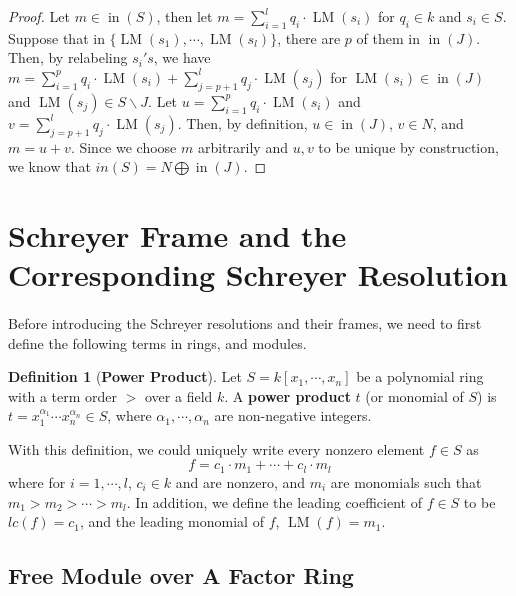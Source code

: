 \documentclass{article}
\newcommand{\lm}{\ensuremath{\operatorname{LM}}}
\newcommand{\initTerm}{\ensuremath{\operatorname{in}}}
\theoremstyle{definition}
\newtheorem{definition}{Definition}[section]
\theoremstyle{remark}
\theoremstyle{example}
\begin{document}
\begin{proof}
    Let $m \in \initTerm(S)$, then let $m = \sum_{i = 1}^{l}{q_i\cdot \lm(s_i)}$ for $q_i \in k$ and $s_i \in S$. Suppose that in $\{\lm(s_1),\cdots,\lm(s_l)\}$, there are $p$ of them in $\initTerm(J)$. Then, by relabeling $s_i's$, we have $m = \sum_{i = 1}^{p}{q_i \cdot \lm(s_i)} + \sum_{j = p+1}^{l}{q_j\cdot \lm(s_j)}$ for $\lm(s_i) \in \initTerm(J)$ and $\lm(s_j) \in S\backslash J$. Let $u = \sum_{i = 1}^{p}{q_i \cdot \lm(s_i)}$ and $v = \sum_{j = p+1}^{l}{q_j\cdot \lm(s_j)}$. Then, by definition, $u \in \initTerm(J)$, $v \in N$, and $m = u + v$. Since we choose $m$ arbitrarily and $u,v$ to be unique by construction, we know that $in(S) = N \bigoplus \initTerm(J)$.
\end{proof}

\section{Schreyer Frame and the Corresponding Schreyer Resolution}

\paragraph{}

Before introducing the Schreyer resolutions and their frames, we need to first define the following terms in rings, and modules.

\begin{definition}[\textbf{Power Product}]
    Let $S = k[x_1,\cdots, x_n]$ be a polynomial ring with a term order $>$ over a field $k$. A \textbf{power product} $t$ (or monomial of $S$) is $t = x_1^{\alpha_1}\cdots x_n^{\alpha_n} \in S$, where $\alpha_1, \cdots, \alpha_n$ are non-negative integers.
\end{definition}

With this definition, we could uniquely write every nonzero element $f \in S$ as 
\begin{equation}
    f = c_1\cdot m_1 + \cdots + c_l\cdot m_l
\end{equation}
where for $i = 1, \cdots, l$, $c_i \in k$ and are nonzero, and $m_i$ are monomials such that $m_1 > m_2 > \cdots > m_l$. In addition, we define the leading coefficient of $f \in S$ to be $lc(f) = c_1$, and the leading monomial of $f$, $\lm(f) = m_1$.

\subsection{Free Module over A Factor Ring}
\end{document}
